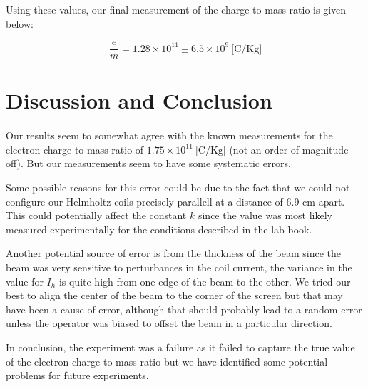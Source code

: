 \documentclass{article}
\begin{document}
Using these values, our final measurement of the charge to mass ratio is given below:

\[
  \frac{e}{m} = 1.28 \times 10^{11} \pm 6.5 \times 10^{9} ~\text{[C/Kg]}
\]

\section{Discussion and Conclusion}
\paragraph{}

Our results seem to somewhat agree with the known measurements for the electron charge to mass ratio of \( 1.75 \times 10^{11} ~\text{[C/Kg]}\) \autocite{mohr2016} (not an order of magnitude off). But our measurements seem to have some systematic errors.

Some possible reasons for this error could be due to the fact that we could not configure our Helmholtz coils precisely parallell at a distance of 6.9 cm apart. This could potentially affect the constant \(k\) since the value was most likely measured experimentally for the conditions described in the lab book.

Another potential source of error is from the thickness of the beam since the beam was very sensitive to perturbances in the coil current, the variance in the value for \(I_h\) is quite high from one edge of the beam to the other. We tried our best to align the center of the beam to the corner of the screen but that may have been a cause of error, although that should probably lead to a random error unless the operator was biased to offset the beam in a particular direction.

In conclusion, the experiment was a failure as it failed to capture the true value of the electron charge to mass ratio but we have identified some potential problems for future experiments.

\printbibliography
\end{document}
